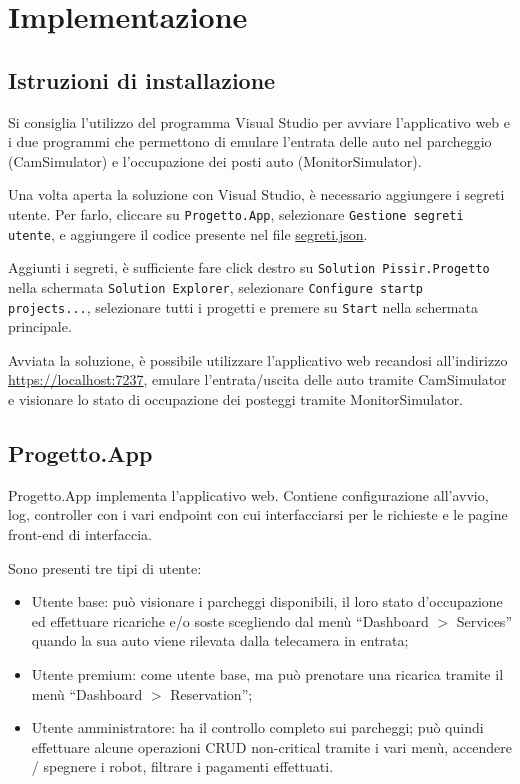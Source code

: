 \documentclass{article}
\begin{document}
\section{Implementazione}
\subsection{Istruzioni di installazione}
Si consiglia l'utilizzo del programma Visual Studio per avviare l'applicativo web e i due programmi che permettono di emulare l'entrata delle auto nel parcheggio (CamSimulator) e l'occupazione dei posti auto (MonitorSimulator).

Una volta aperta la soluzione con Visual Studio, è necessario aggiungere i segreti utente. Per farlo, cliccare su \texttt{Progetto.App}, selezionare \texttt{Gestione segreti utente}, e aggiungere il codice presente nel file \href{run:./segreti.json}{segreti.json}.

Aggiunti i segreti, è sufficiente fare click destro su \texttt{Solution Pissir.Progetto} nella schermata \texttt{Solution Explorer}, selezionare \texttt{Configure startp projects...}, selezionare tutti i progetti e premere su \texttt{Start} nella schermata principale.

Avviata la soluzione, è possibile utilizzare l'applicativo web recandosi all'indirizzo \url{https://localhost:7237}, emulare l'entrata/uscita delle auto tramite CamSimulator e visionare lo stato di occupazione dei posteggi tramite MonitorSimulator.
\subsection{Progetto.App}
Progetto.App implementa l'applicativo web. Contiene configurazione all'avvio, log, controller con i vari endpoint con cui interfacciarsi per le richieste e le pagine front-end di interfaccia.

Sono presenti tre tipi di utente:
\begin{itemize}
    \item Utente base: può visionare i parcheggi disponibili, il loro stato d'occupazione ed effettuare ricariche e/o soste scegliendo dal menù “Dashboard $>$ Services” quando la sua auto viene rilevata dalla telecamera in entrata;
    \item Utente premium: come utente base, ma può prenotare una ricarica tramite il menù
    “Dashboard $>$ Reservation”;
    \item Utente amministratore: ha il controllo completo sui parcheggi; può quindi effettuare alcune operazioni CRUD non-critical tramite i vari menù, accendere / spegnere i robot, filtrare i pagamenti effettuati.
\end{itemize}
\end{document}
